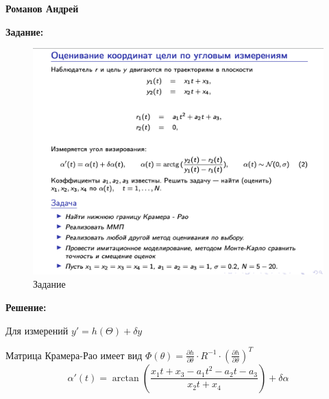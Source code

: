 \documentclass[a4paper,14pt]{article}
\theoremstyle{plain} %
\theoremstyle{definition} %
\theoremstyle{remark} %
\begin{document}
\textbf{Романов Андрей}

\textbf{Задание:}

\begin{figure}[h!]
	\centering
	\includegraphics[width=0.9\linewidth]{tasks.png}
	\caption{Задание}
	\label{fig:gyrobus}
\end{figure}

\textbf{Решение:}

Для измерений
$y'=h(\Theta)+\delta y$

Матрица Крамера-Рао имеет вид
$\Phi(\theta)=\frac{\partial h}{\partial \theta}\cdot R^{-1} \cdot \left(\frac{\partial h}{\partial \theta}\right)^T$
$$\alpha'(t)=\arctan(\frac{x_1t+x_3-a_1t^2-a_2t-a_3}{x_2t+x_4})+\delta \alpha$$
\end{document}
